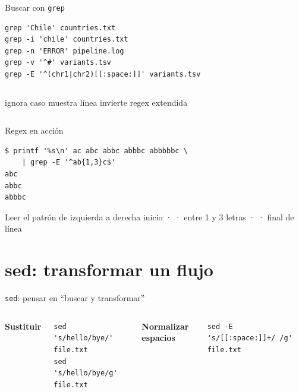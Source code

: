 \documentclass[aspectratio=169,11pt]{beamer}
\begin{document}
\begin{frame}[fragile]{Buscar con \texttt{grep}}
\begin{lstlisting}
grep 'Chile' countries.txt
grep -i 'chile' countries.txt
grep -n 'ERROR' pipeline.log
grep -v '^#' variants.tsv
grep -E '^(chr1|chr2)[[:space:]]' variants.tsv
\end{lstlisting}
  \vspace{4mm}
  \begin{columns}[T,onlytextwidth]
    \; ignora caso
    \; muestra línea
    \; invierte
    \; regex extendida
  \end{columns}
\end{frame}

\begin{frame}[fragile]{Regex en acción}
\begin{lstlisting}
$ printf '%s\n' ac abc abbc abbbc abbbbbc \
    | grep -E '^ab{1,3}c$'
abc
abbc
abbbc
\end{lstlisting}
  \vspace{3mm}
  \begin{wideblock}{Leer el patrón de izquierda a derecha}
    inicio ·  · entre 1 y 3 letras  ·  · final de línea
  \end{wideblock}
\end{frame}

\section{sed: transformar un flujo}

\begin{frame}[fragile]{\texttt{sed}: pensar en ``buscar y transformar''}
  \begin{columns}[T,onlytextwidth]
      \textbf{Sustituir}
\begin{lstlisting}
sed 's/hello/bye/' file.txt
sed 's/hello/bye/g' file.txt
\end{lstlisting}
      \textbf{Normalizar espacios}
\begin{lstlisting}
sed -E 's/[[:space:]]+/ /g' file.txt
\end{lstlisting}
  \end{columns}
  \vspace{5mm}
  \centering {}
\end{frame}
\end{document}
